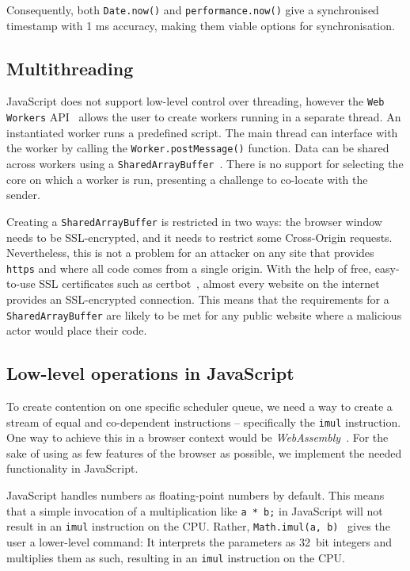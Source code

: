 \documentclass[11pt,
  titlepage=false,
  parskip=half,      %
]{scrreprt}
\begin{document}
Consequently, both \texttt{Date.now()} and \texttt{performance.now()} give a synchronised timestamp with 1 ms accuracy, making them viable options for synchronisation.

\subsection{Multithreading}\label{subsec:multithreading}
JavaScript does not support low-level control over threading, however the \texttt{Web Workers} API~\cite{webworkers} allows the user to create workers running in a separate thread.
An instantiated worker runs a predefined script.
The main thread can interface with the worker by calling the \texttt{Worker.postMessage()} function.
Data can be shared across workers using a \texttt{SharedArrayBuffer}~\cite{sharedarraybuffer}.
There is no support for selecting the core on which a worker is run, presenting a challenge to co-locate with the sender.

Creating a \texttt{SharedArrayBuffer} is restricted in two ways: the browser window needs to be SSL-encrypted, and it needs to restrict some Cross-Origin requests.
Nevertheless, this is not a problem for an attacker on any site that provides \texttt{https} and where all code comes from a single origin.
With the help of free, easy-to-use SSL certificates such as certbot~\cite{certbot}, almost every website on the internet provides an SSL-encrypted connection.
This means that the requirements for a \texttt{SharedArrayBuffer} are likely to be met for any public website where a malicious actor would place their code.

\subsection{Low-level operations in JavaScript}\label{subsec:lowleveljs}
To create contention on one specific scheduler queue, we need a way to create a stream of equal and co-dependent instructions -- specifically the \texttt{imul} instruction.
One way to achieve this in a browser context would be \textit{WebAssembly}~\cite{webassembly}.
For the sake of using as few features of the browser as possible, we implement the needed functionality in JavaScript.

JavaScript handles numbers as floating-point numbers by default.
This means that a simple invocation of a multiplication like \texttt{a * b;} in JavaScript will not result in an \texttt{imul} instruction on the CPU.
Rather, \texttt{Math.imul(a, b)}~\cite{mathimul} gives the user a lower-level command:
It interprets the parameters as 32~bit integers and multiplies them as such, resulting in an \texttt{imul} instruction on the CPU.
\end{document}
